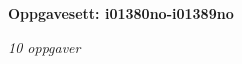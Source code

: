 \centerline{\bf Oppgavesett: i01380no-i01389no}
\vskip 10pt
\centerline{\it 10 oppgaver}\vskip 10pt
\vskip 10pt
